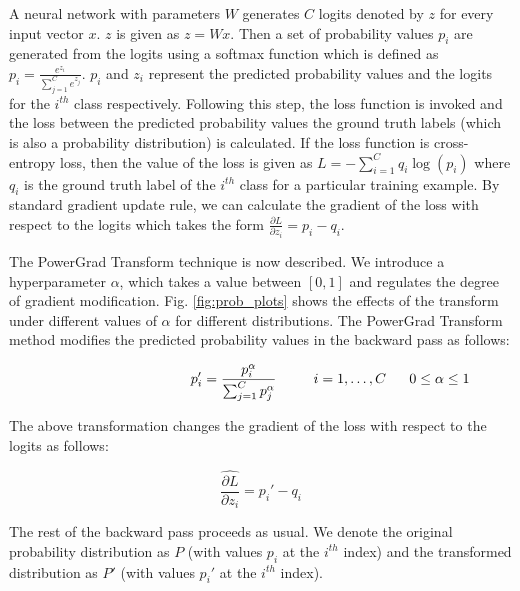\documentclass[runningheads]{llncs}
\begin{document}
A neural network with parameters $W$ generates $C$ logits denoted by $z$ for every input
vector $x$. $z$ is given as $z=Wx$. Then a set of probability values $p_i$ are generated
from the logits using a softmax function which is defined as $p_i=\frac{e^{z_i}}{\sum
_{j=1}^C e^{z_j}}$. $p_i$ and $z_i$ represent the predicted probability values and the
logits for the $i^{th}$ class respectively. Following this step, the loss function is
invoked and the loss between the predicted probability values the ground truth labels
(which is also a probability distribution) is calculated. If the loss function is
cross-entropy loss, then the value of the loss is given as $L=-\sum _{i=1}^C q_i \log
\left(p_i\right)$ where $q_i$ is the ground truth label of the $i^{th}$ class for a
particular training example. By standard gradient update rule, we can calculate the
gradient of the loss with respect to the logits which takes the form $\frac{\partial
L}{\partial z_i}=p_i-q_i$.

The PowerGrad Transform technique is now described. We introduce a hyperparameter
$\alpha$, which takes a value between $[0, 1]$ and regulates the degree of gradient
modification. Fig. \ref{fig:prob_plots} shows the effects of the transform under
different values of $\alpha$ for different distributions. The PowerGrad Transform method
modifies the predicted probability values in the backward pass as follows:

\vspace{-0.5cm}
\begin{equation} \hspace*{3.5cm} p_i'=\frac{p_i^{\alpha }}{\sum _{j=1}^C
p_j^\alpha} \ \ \ \ \ \ \ \ i=1,\dots,C\ \ \ \ \ 0 \leq \alpha\leq 1
\label{transformed_probabilities} \end{equation}

The above transformation changes the gradient of the loss with respect to the logits as
follows:

\vspace{-0.5cm}
\begin{equation} \widehat{\frac{\partial L}{\partial z_i}}=p_i'-q_i
\label{PGT_logit_derivative}
\end{equation}

The rest of the backward pass proceeds as usual. We denote the original probability
distribution as $P$ (with values $p_i$ at the $i^{th}$ index) and the transformed
distribution as $P'$ (with values $p_i'$ at the $i^{th}$ index).
\end{document}

